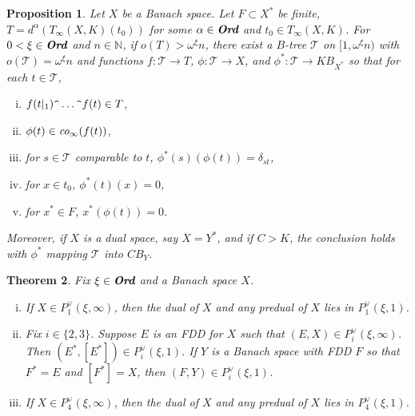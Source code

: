 \documentclass[12pt]{amsart}
\newtheorem{theorem}{Theorem}[section]
\newtheorem{proposition}[theorem]{Proposition}
\theoremstyle{definition}
\newcommand{\ord}{\textbf{Ord}}
\newcommand{\nn}{\mathbb{N}}
\newcommand{\ttt}{\mathcal{T}}
\begin{document}
\begin{proposition} Let $X$ be a Banach space.  Let $F\subset X^*$ be finite, $T=d^\alpha(T_\infty(X, K)(t_0))$ for some $\alpha\in \emph{\ord}$ and $t_0\in T_\infty(X,K)$.  For $0<\xi\in \emph{\ord}$ and $n\in \nn$, if $o(T)>\omega^\xi n$, there exist a $B$-tree $\ttt$ on $[1, \omega^\xi n)$ with $o(\ttt)=\omega^\xi n$ and functions $f:\ttt\to T$, $\phi:\ttt\to X$, and $\phi^*:\ttt\to KB_{X^*}$ so that for each $t\in \ttt$, \begin{enumerate}[(i)]\item $f(t|_1)\verb!^!\ldots \verb!^!f(t)\in T$, \item $\phi(t)\in \emph{\text{co}}_\infty(f(t))$, \item for $s\in \ttt$ comparable to $t$, $\phi^*(s)(\phi(t))=\delta_{st}$, \item for $x\in t_0$, $\phi^*(t)(x)=0$, \item for $x^*\in F$, $x^*(\phi(t))=0$. 

\end{enumerate}

Moreover, if $X$ is a dual space, say $X=Y^*$, and if $C>K$, the conclusion holds with $\phi^*$ mapping $\ttt$ into $CB_Y$.  



\label{dualize}

\end{proposition}



\begin{theorem} Fix $\xi\in \emph{\ord}$ and a Banach space $X$.   \begin{enumerate}[(i)]\item  If $X\in P^\vee_1(\xi, \infty)$, then the dual of $X$ and any predual of $X$ lies in $P^\vee_1(\xi, 1)$.  \item Fix $i\in \{2,3\}$.  Suppose $E$ is an FDD for $X$ such that $(E,X)\in P^\vee_i(\xi, \infty)$. Then $(E^*, [E^*])\in P^\vee_i(\xi, 1)$.  If $Y$ is a Banach space with FDD $F$ so that $F^*=E$ and $[F^*]=X$, then $(F, Y)\in P^\vee_i(\xi, 1)$.  \item If $X\in P^\vee_4(\xi, \infty)$, then the dual of $X$ and any predual of $X$ lies in $P^\vee_4(\xi, 1)$.  \end{enumerate}



\end{theorem}
\end{document}
